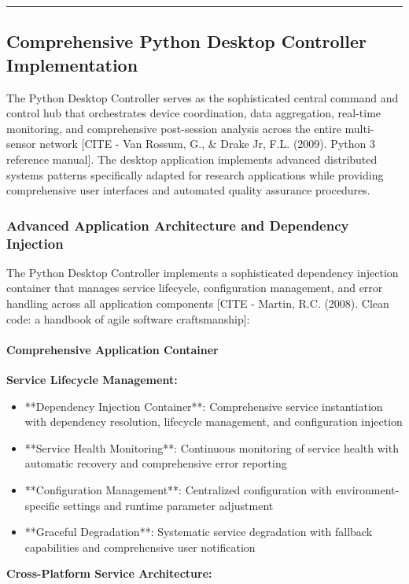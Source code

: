 \documentclass[12pt,a4paper]{article}
\begin{document}
\hrule

\subsection{Comprehensive Python Desktop Controller Implementation}

The Python Desktop Controller serves as the sophisticated central command and control hub that orchestrates device
coordination, data aggregation, real-time monitoring, and comprehensive post-session analysis across the entire
multi-sensor network [CITE - Van Rossum, G., \& Drake Jr, F.L. (2009). Python 3 reference manual]. The desktop
application implements advanced distributed systems patterns specifically adapted for research applications while
providing comprehensive user interfaces and automated quality assurance procedures.

\subsubsection{Advanced Application Architecture and Dependency Injection}

The Python Desktop Controller implements a sophisticated dependency injection container that manages service lifecycle,
configuration management, and error handling across all application
components [CITE - Martin, R.C. (2008). Clean code: a handbook of agile software craftsmanship]:

\paragraph{Comprehensive Application Container}

\textbf{Service Lifecycle Management:}

\begin{itemize}
\item **Dependency Injection Container**: Comprehensive service instantiation with dependency resolution, lifecycle
  management, and configuration injection
\item **Service Health Monitoring**: Continuous monitoring of service health with automatic recovery and comprehensive error
  reporting
\item **Configuration Management**: Centralized configuration with environment-specific settings and runtime parameter
  adjustment
\item **Graceful Degradation**: Systematic service degradation with fallback capabilities and comprehensive user
  notification

\end{itemize}
\textbf{Cross-Platform Service Architecture:}
\end{document}
